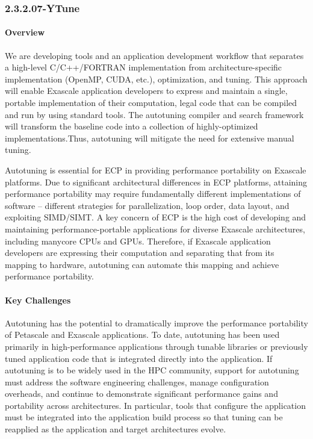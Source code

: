 \subsubsection{2.3.2.07-YTune} 

\paragraph{Overview} 

We are developing tools and an application development workflow that separates a high-level C/C++/FORTRAN implementation from architecture-specific implementation (OpenMP, CUDA, etc.), optimization, and  tuning.   This  approach 
will enable Exascale application  developers to express and  maintain a    single, portable implementation of their computation, legal code that can be compiled and run by using standard tools.   The autotuning compiler and search framework will transform the baseline code into a   collection of highly-optimized implementations.Thus, autotuning will mitigate the need for extensive manual tuning. 

Autotuning is essential for ECP in providing performance portability on Exascale platforms.  Due to significant architectural differences in ECP platforms, attaining performance portability may  require fundamentally different  implementations of software -- different strategies for parallelization, loop order,  data layout, and exploiting SIMD/SIMT.  A    key concern of ECP is the high cost of developing  and maintaining performance-portable applications for  diverse Exascale architectures, including manycore CPUs and GPUs.  Therefore, if   Exascale application developers are expressing their computation and separating that from   its mapping to hardware, autotuning can automate this mapping and achieve performance portability.

\paragraph{Key  Challenges}
Autotuning has the potential to dramatically improve the performance portability of Petascale and Exascale applications.  To date, autotuning has been used primarily in high-performance applications through tunable libraries or previously tuned application code that is integrated directly into the application.  
If autotuning is to be widely used in the HPC community, 
support for autotuning must address the software engineering challenges, manage configuration overheads, and continue to demonstrate significant performance gains and portability across architectures.
In particular, tools that configure the application must be integrated into the application build process so that tuning can be reapplied as the application and target architectures evolve.

